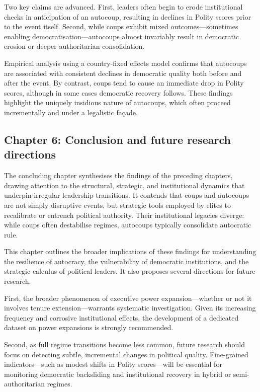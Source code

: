 \documentclass[
  12pt,
]{report}
\begin{document}
Two key claims are advanced. First, leaders often begin to erode
institutional checks in anticipation of an autocoup, resulting in
declines in Polity scores prior to the event itself. Second, while coups
exhibit mixed outcomes---sometimes enabling democratisation---autocoups
almost invariably result in democratic erosion or deeper authoritarian
consolidation.

Empirical analysis using a country-fixed effects model confirms that
autocoups are associated with consistent declines in democratic quality
both before and after the event. By contrast, coups tend to cause an
immediate drop in Polity scores, although in some cases democratic
recovery follows. These findings highlight the uniquely insidious nature
of autocoups, which often proceed incrementally and under a legalistic
façade.

\subsection*{Chapter 6: Conclusion and future research
directions}\label{chapter-6-conclusion-and-future-research-directions}

The concluding chapter synthesises the findings of the preceding
chapters, drawing attention to the structural, strategic, and
institutional dynamics that underpin irregular leadership transitions.
It contends that coups and autocoups are not simply disruptive events,
but strategic tools employed by elites to recalibrate or entrench
political authority. Their institutional legacies diverge: while coups
often destabilise regimes, autocoups typically consolidate autocratic
rule.

This chapter outlines the broader implications of these findings for
understanding the resilience of autocracy, the vulnerability of
democratic institutions, and the strategic calculus of political
leaders. It also proposes several directions for future research.

First, the broader phenomenon of executive power expansion---whether or
not it involves tenure extension---warrants systematic investigation.
Given its increasing frequency and corrosive institutional effects, the
development of a dedicated dataset on power expansions is strongly
recommended.

Second, as full regime transitions become less common, future research
should focus on detecting subtle, incremental changes in political
quality. Fine-grained indicators---such as modest shifts in Polity
scores---will be essential for monitoring democratic backsliding and
institutional recovery in hybrid or semi-authoritarian regimes.
\end{document}
